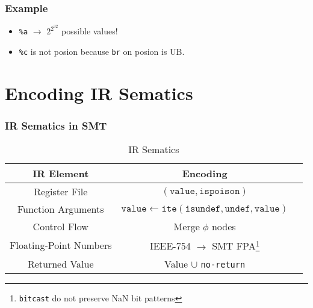 \documentclass[aspectratio=169]{ctexbeamer}
\newcommand{\variable}[1]{\mathtt{#1}}
\begin{document}
\begin{frame}[fragile]
    \frametitle{Example}
    \noindent
    \begin{minipage}[t]{0.5\linewidth}
        
    \end{minipage}
    \hfill%
    \begin{minipage}[t]{0.4\linewidth}
        \begin{itemize}
            \item  \texttt{\%a} $\rightarrow$ $2^{2^{32}}$ possible values!
            \item  \texttt{\%c} is not posion because \texttt{br} on posion is UB.
        \end{itemize}
    \end{minipage}
\end{frame}



\section{Encoding IR Sematics}

\begin{frame}
    \frametitle{IR Sematics in SMT}

    \begin{table}
        \centering
        \caption{IR Sematics}
        \begin{tabular}{ccc}
            \toprule
            \textbf{IR Element}    & \textbf{Encoding}                                                                          \\
            \midrule
            Register File          & $(\variable{value}, \variable{ispoison})$                                                  \\
            Function Arguments     & $\variable{value} \leftarrow \mathtt{ite(isundef, undef, value)}$                          \\
            Control Flow           & Merge $\phi$ nodes                                                                         \\
            Floating-Point Numbers & IEEE-754 $\rightarrow$ SMT FPA\footnote{\texttt{bitcast} do not preserve NaN bit patterns} \\
            Returned Value         & Value $\cup$ \texttt{no-return}                                                            \\
            \bottomrule
        \end{tabular}
    \end{table}

\end{frame}
\end{document}
